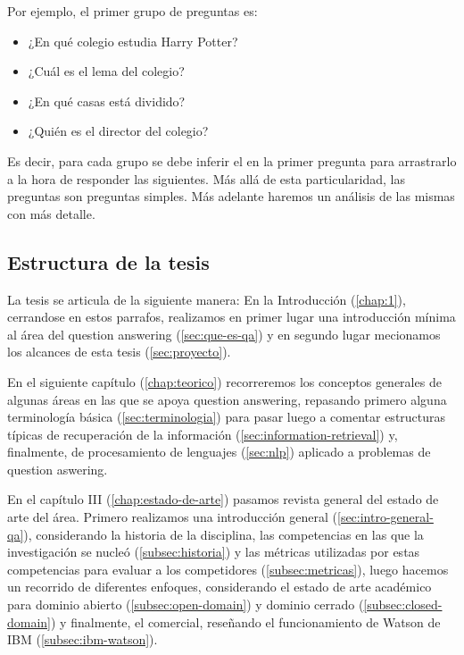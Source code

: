 Por ejemplo, el primer grupo de preguntas es:
\begin{itemize}
\item ¿En qué colegio estudia Harry Potter?
\item ¿Cuál es el lema del colegio?
\item ¿En qué casas está dividido?
\item ¿Quién es el director del colegio?
\end{itemize}
Es decir, para cada grupo se debe inferir el  en la primer pregunta para arrastrarlo a la hora de responder las siguientes. Más allá de esta particularidad,
las preguntas son preguntas simples. Más adelante haremos un análisis de las mismas con más detalle.


\subsection{Estructura de la tesis}
\faltadependiente
La tesis se articula de la siguiente manera: En la Introducción (\ref{chap:1}), cerrandose en estos parrafos, realizamos en primer lugar una introducción mínima al área del question answering (\ref{sec:que-es-qa}) y en segundo lugar mecionamos los alcances de esta tesis (\ref{sec:proyecto}). 

En el siguiente capítulo (\ref{chap:teorico}) recorreremos los conceptos generales de algunas áreas en las que se apoya question answering, repasando primero alguna terminología básica (\ref{sec:terminologia}) para pasar luego a comentar estructuras típicas de recuperación de la información (\ref{sec:information-retrieval}) y, finalmente, de procesamiento de lenguajes (\ref{sec:nlp}) aplicado a problemas de question aswering. 

En el capítulo III (\ref{chap:estado-de-arte}) pasamos revista general del estado de arte del área. Primero realizamos una introducción general (\ref{sec:intro-general-qa}), considerando la historia de la disciplina, las competencias en las que la investigación se nucleó (\ref{subsec:historia}) y las métricas utilizadas por estas competencias para evaluar a los competidores (\ref{subsec:metricas}), luego hacemos un recorrido de diferentes enfoques, considerando el estado de arte académico para dominio abierto (\ref{subsec:open-domain}) y dominio cerrado (\ref{subsec:closed-domain}) y finalmente, el comercial, reseñando el funcionamiento de Watson de IBM (\ref{subsec:ibm-watson}).

